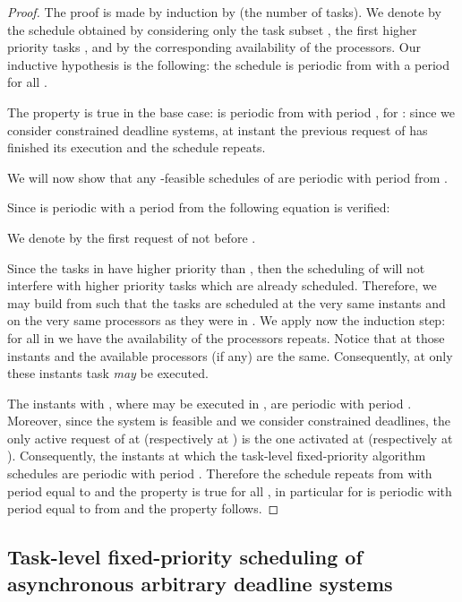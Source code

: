 \documentclass[a4paper,11pt]{article}
\begin{document}
\begin{proof}
  The proof is made by induction by  (the number of tasks). We
  denote by  the schedule obtained by considering only
  the task subset , the first higher priority  tasks
  , and by  the corresponding
  availability of the processors. Our inductive hypothesis is the
  following: the schedule  is periodic from  with a
  period  for all .

  The property is true in the base case:  is periodic
  from  with period , for :
  since we consider constrained deadline systems, at instant  the
  previous request of  has finished its execution and the
  schedule repeats.

  We will now show that any -feasible schedules of  are
  periodic with period  from .

  Since  is periodic with a period  from  the
  following equation is verified:



We denote by  the first request of
 not before .

Since the tasks in  have higher priority than
, then the scheduling of  will not interfere with
higher priority tasks which are already scheduled. Therefore, we may
build  from  such that the tasks
 are scheduled at the very same
instants and on the very same processors as they were in
. We apply now the induction step: for all  in  we have  the
availability of the processors repeats. Notice that at those instants 
and  the available processors (if any) are the same. Consequently, at
only these instants task  {\em may} be executed.

The instants  with , where
 may be executed in , are periodic with
period . Moreover, since the system is feasible and we consider constrained deadlines, the only active request of  at  (respectively at ) is the one activated at  (respectively at ). Consequently, the instants at which the task-level fixed-priority algorithm  schedules  are periodic with period . Therefore the schedule  repeats from  with period equal to  and the property is true for all , in particular for   is periodic with period equal to  from  and the property follows.
\end{proof}


\subsection{Task-level fixed-priority scheduling of asynchronous arbitrary 
  deadline systems} \label{asynSectArb}
\end{document}

